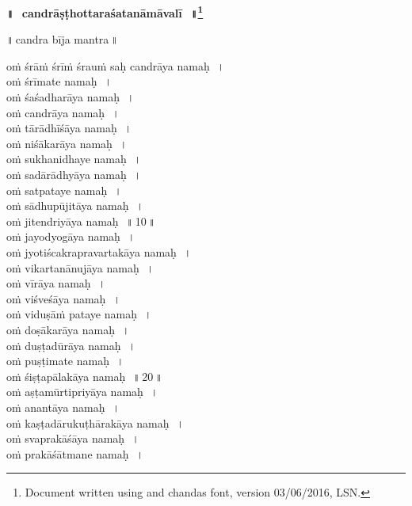 \documentclass[parskip, DIV=14, pagenumber=head,top]{scrartcl}
\renewcommand{\thefootnote}{\fnsymbol{footnote}} %
\begin{document}

\vspace{-1.5cm}

\begin{center}
\textbf{{\Huge॥\,~candrāṣṭhottaraśatanāmāvalī\,~॥\LARGE\let\thefootnote\relax\footnote{\color{lightgray} Document written using \XeLaTeX{} and chandas font, version 03/06/2016, LSN.}}}
\end{center}
\Large

\centering	

॥\,candra bīja mantra\,॥\\
\vspace{0.5cm}

oṁ śrāṁ śrīṁ śrauṁ saḥ candrāya namaḥ\,~।\\
\vspace{1.5cm}
oṁ śrīmate namaḥ\,~।\\
oṁ śaśadharāya namaḥ\,~।\\
oṁ candrāya namaḥ\,~।\\
oṁ tārādhīśāya namaḥ\,~।\\
oṁ niśākarāya namaḥ\,~।\\
oṁ sukhanidhaye namaḥ\,~।\\
oṁ sadārādhyāya namaḥ\,~।\\
oṁ satpataye namaḥ\,~।\\
oṁ sādhupūjitāya namaḥ\,~।\\
oṁ jitendriyāya namaḥ\,~॥\,10\,॥\\ 
oṁ jayodyogāya namaḥ\,~।\\
oṁ jyotiścakrapravartakāya namaḥ\,~।\\
oṁ vikartanānujāya namaḥ\,~।\\
oṁ vīrāya namaḥ\,~।\\
oṁ viśveśāya namaḥ\,~।\\
oṁ viduṣāṁ pataye namaḥ\,~।\\
oṁ doṣākarāya namaḥ\,~।\\
oṁ duṣṭadūrāya namaḥ\,~।\\
oṁ puṣṭimate namaḥ\,~।\\
oṁ śiṣṭapālakāya namaḥ\,~॥\,20\,॥\\ 
oṁ aṣṭamūrtipriyāya namaḥ\,~।\\
oṁ anantāya namaḥ\,~।\\
oṁ kaṣṭadārukuṭhārakāya namaḥ\,~।\\
oṁ svaprakāśāya namaḥ\,~।\\
oṁ prakāśātmane namaḥ\,~।\\
\end{document}
